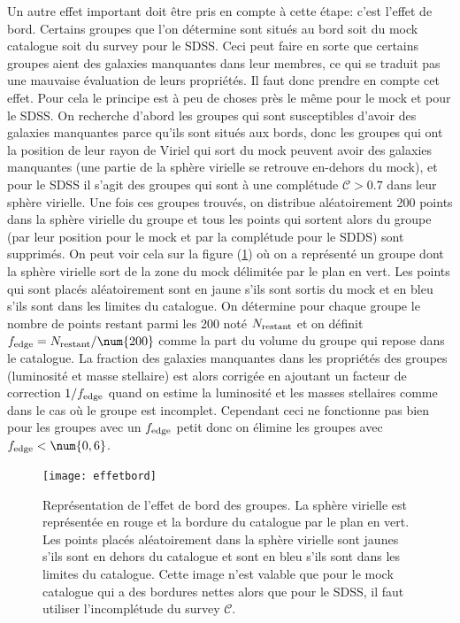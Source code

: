 Un autre effet important doit être pris en compte à cette étape: c'est l'effet de bord. Certains groupes que l'on détermine sont
situés au bord soit du mock catalogue soit du survey pour le SDSS. Ceci peut faire en sorte que certains groupes aient des galaxies
manquantes dans leur membres, ce qui se traduit pas une mauvaise évaluation de leurs propriétés. Il faut donc prendre en compte cet
effet. Pour cela le principe est à peu de choses près le même pour le mock et pour le SDSS. On recherche d'abord les groupes qui
sont susceptibles d'avoir des galaxies manquantes parce qu'ils sont situés aux bords, donc les groupes qui ont la position de leur
rayon de Viriel qui sort du mock peuvent avoir des galaxies manquantes (une partie de la sphère virielle se retrouve en-dehors du
mock), et pour le SDSS il s'agit des groupes qui sont à une complétude $\mathcal{C}>\num{0,7}$ dans leur sphère virielle. Une fois
ces groupes trouvés, on distribue aléatoirement \num{200} points dans la sphère virielle du groupe et tous les points qui sortent
alors du groupe (par leur position pour le mock et par la complétude pour le SDDS) sont supprimés. On peut voir cela sur la figure
(\ref{fig:effetbord}) où on a représenté un groupe dont la sphère virielle sort de la zone du mock délimitée par le plan en vert.
Les points qui sont placés aléatoirement sont en jaune s'ils sont sortis du mock et en bleu s'ils sont dans les limites du
catalogue. On détermine pour chaque groupe le nombre de points restant parmi les \num{200} noté $N_{\rm{restant}}$ et on définit
$f_{\rm{edge}}=N_{\rm{restant}}/\num{200}$ comme la part du volume du groupe qui repose dans le catalogue. La fraction des galaxies
manquantes dans les propriétés des groupes (luminosité et masse stellaire) est alors corrigée en ajoutant un facteur de correction
$1/f_{\rm{edge}}$ quand on estime la luminosité et les masses stellaires comme dans le cas où le groupe est incomplet. Cependant
ceci ne fonctionne pas bien pour les groupes avec un $f_{\rm{edge}}$ petit donc on élimine les groupes avec
$f_{\rm{edge}}<\num{0,6}$.
\begin{figure}[htb]
	\centering
	\texttt{[image: effetbord]}
	\caption{\footnotesize{}Représentation de l'effet de bord des groupes. La sphère virielle est représentée en rouge et la
	bordure du catalogue par le plan en vert. Les points placés aléatoirement dans la sphère virielle sont jaunes s'ils sont en
	dehors du catalogue et sont en bleu s'ils sont dans les limites du catalogue. Cette image n'est valable que pour le mock
	catalogue qui a des bordures nettes alors que pour le SDSS, il faut utiliser l'incomplétude du survey $\mathcal{C}$.}
	\label{fig:effetbord}
\end{figure}

